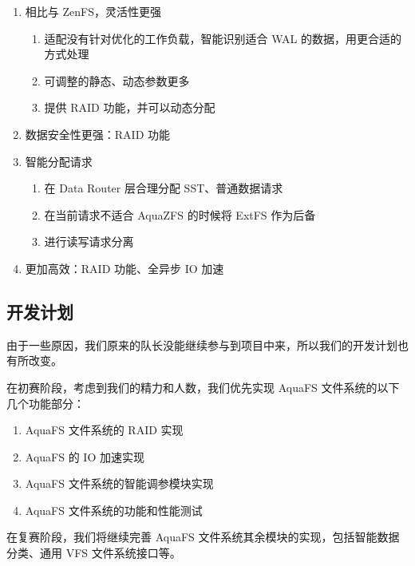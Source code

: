 \begin{enumerate}
    \item 相比与 ZenFS，灵活性更强
    \begin{enumerate}
        \item 适配没有针对优化的工作负载，智能识别适合 WAL 的数据，用更合适的方式处理
        \item 可调整的静态、动态参数更多
        \item 提供 RAID 功能，并可以动态分配
    \end{enumerate}
    \item 数据安全性更强：RAID 功能
    \item 智能分配请求
    \begin{enumerate}
        \item 在 Data Router 层合理分配 SST、普通数据请求
        \item 在当前请求不适合 AquaZFS 的时候将 ExtFS 作为后备
        \item 进行读写请求分离
    \end{enumerate}
    \item 更加高效：RAID 功能、全异步 IO 加速
\end{enumerate}

\subsection{开发计划}

由于一些原因，我们原来的队长没能继续参与到项目中来，所以我们的开发计划也有所改变。

在初赛阶段，考虑到我们的精力和人数，我们优先实现 AquaFS 文件系统的以下几个功能部分：

\begin{enumerate}
  \item AquaFS 文件系统的 RAID 实现
  \item AquaFS 的 IO 加速实现
  \item AquaFS 文件系统的智能调参模块实现
  \item AquaFS 文件系统的功能和性能测试
\end{enumerate}

在复赛阶段，我们将继续完善 AquaFS 文件系统其余模块的实现，包括智能数据分类、通用 VFS 文件系统接口等。